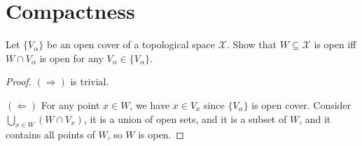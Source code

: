 \documentclass[./main.tex]{subfiles}
\begin{document}
\section{Compactness}

\begin{exercise}
  Let $\{V_\alpha\}$ be an open cover of a topological space $\mathcal{X}$.
  Show that $W \subseteq \mathcal{X}$ is open iff $W \cap V_\alpha$ is open for any
  $V_\alpha \in \{V_\alpha\}$.
\end{exercise}
\begin{proof}
  $(\Rightarrow)$ is trivial. \par
  $(\Leftarrow)$ For any point $x \in W$, we have $x \in V_x$ since $\{V_\alpha\}$ is open cover.
  Consider $\bigcup_{x \in W} (W \cap V_x)$, it is a union of open sets, and it is a subset of $W$,
  and it contains all points of $W$, so $W$ is open.
\end{proof}
\end{document}
